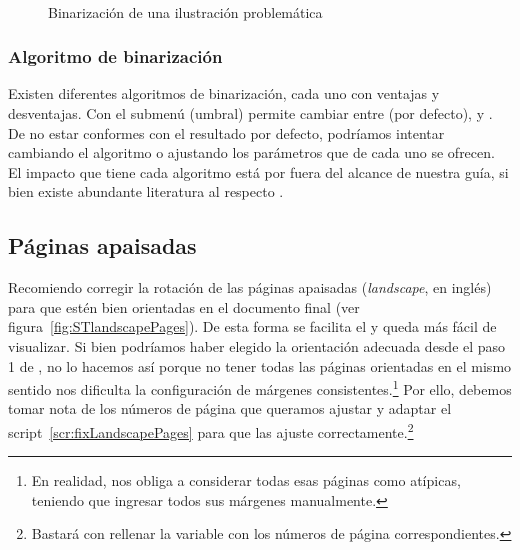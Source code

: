 \documentclass[%
	a5paper,
	10pt,
	twoside,
	openright,
	final,
]{memoir}
\begin{document}
	\begin{figure}
		\hspace*{\fill}
		\hfill
		\hspace*{\fill}\\
		\hspace*{\fill}
		\hfill
		\hspace*{\fill}
		\caption{Binarización de una ilustración problemática\label{fig:SToutputBadDiagrams}}
	\end{figure}

	\subsubsection{Algoritmo de binarización} Existen diferentes algoritmos de binarización, cada uno con ventajas y desventajas. Con el submenú  (umbral) \scantailor permite cambiar entre  (por defecto),  y . De no estar conformes con el resultado por defecto, podríamos intentar cambiando el algoritmo o ajustando los parámetros que de cada uno se ofrecen. El impacto que tiene cada algoritmo está por fuera del alcance de nuestra guía, si bien existe abundante literatura al respecto \cite{RashmiBinarization}.

	\subsection{Páginas apaisadas\label{sec:landscapePages}} Recomiendo corregir la rotación de las páginas apaisadas (\emph{landscape}, en inglés) para que estén bien orientadas en el documento final (ver figura~\ref{fig:STlandscapePages}). De esta forma se facilita el \ocr y queda más fácil de visualizar. Si bien podríamos haber elegido la orientación adecuada desde el paso 1 de \scantailor, no lo hacemos así porque no tener todas las páginas orientadas en el mismo sentido nos dificulta la configuración de márgenes consistentes.\footnote{En realidad, nos obliga a considerar todas esas páginas como atípicas, teniendo que ingresar todos sus márgenes manualmente.} Por ello, debemos tomar nota de los números de página que queramos ajustar y adaptar el script~\ref{scr:fixLandscapePages} para que las ajuste correctamente.\footnote{Bastará con rellenar la variable  con los números de página correspondientes.}
\end{document}
